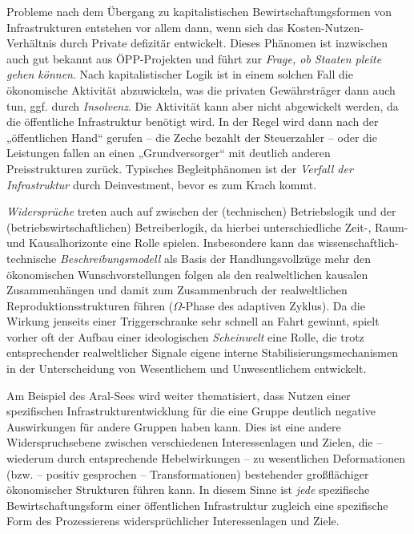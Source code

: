 \documentclass[11pt,a4paper]{article}
\begin{document}
Probleme nach dem Übergang zu kapitalistischen Bewirtschaftungsformen von
Infrastrukturen entstehen vor allem dann, wenn sich das
Kosten-Nutzen-Verhältnis durch Private defizitär entwickelt. Dieses Phänomen
ist inzwischen auch gut bekannt aus ÖPP-Projekten und führt zur \emph{Frage,
  ob Staaten pleite gehen können}. Nach kapitalistischer Logik ist in einem
solchen Fall die ökonomische Aktivität abzuwickeln, was die privaten
Gewährsträger dann auch tun, ggf. durch \emph{Insolvenz}. Die Aktivität kann
aber nicht abgewickelt werden, da die öffentliche Infrastruktur benötigt
wird. In der Regel wird dann nach der „öffentlichen Hand“ gerufen -- die Zeche
bezahlt der Steuerzahler -- oder die Leistungen fallen an einen
„Grundversorger“ mit deutlich anderen Preisstrukturen zurück. Typisches
Begleitphänomen ist der \emph{Verfall der Infrastruktur} durch Deinvestment,
bevor es zum Krach kommt.

\emph{Widersprüche} treten auch auf zwischen der (technischen) Betriebslogik
und der (betriebswirtschaftlichen) Betreiberlogik, da hierbei unterschiedliche
Zeit-, Raum- und Kausalhorizonte eine Rolle spielen. Insbesondere kann das
wissenschaftlich-technische \emph{Beschreibungsmodell} als Basis der
Handlungsvollzüge mehr den ökonomischen Wunschvorstellungen folgen als den
realweltlichen kausalen Zusammenhängen und damit zum Zusammenbruch der
realweltlichen Reproduktionsstrukturen führen ($\Omega$-Phase des adaptiven
Zyklus). Da die Wirkung jenseits einer Triggerschranke sehr schnell an Fahrt
gewinnt, spielt vorher oft der Aufbau einer ideologischen \emph{Scheinwelt}
eine Rolle, die trotz entsprechender realweltlicher Signale eigene interne
Stabilisierungsmechanismen in der Unterscheidung von Wesentlichem und
Unwesentlichem entwickelt.

Am Beispiel des Aral-Sees wird weiter thematisiert, dass Nutzen einer
spezifischen Infrastrukturentwicklung für die eine Gruppe deutlich negative
Auswirkungen für andere Gruppen haben kann. Dies ist eine andere
Widerspruchsebene zwischen verschiedenen Interessenlagen und Zielen, die --
wiederum durch entsprechende Hebelwirkungen -- zu wesentlichen Deformationen
(bzw. -- positiv gesprochen -- Transformationen) bestehender großflächiger
ökonomischer Strukturen führen kann. In diesem Sinne ist \emph{jede}
spezifische Bewirtschaftungsform einer öffentlichen Infrastruktur zugleich
eine spezifische Form des Prozessierens widersprüchlicher Interessenlagen und
Ziele.
\end{document}
